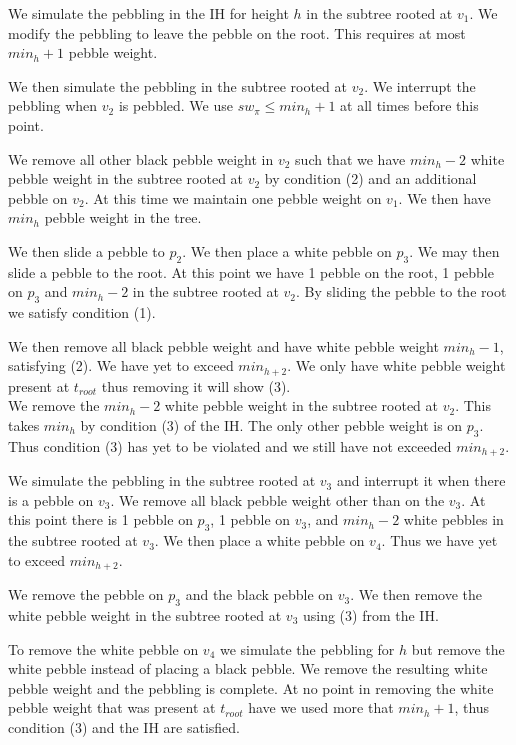 \documentclass[12pt]{article}
\newcommand{\troot}{t_{root}}
\begin{document}
We simulate the pebbling in the IH for height $h$ in the subtree rooted at $v_1$. We modify the pebbling to leave the pebble on the root. This requires at most $min_h+1$ pebble weight.

We then simulate the pebbling in the subtree rooted at $v_2$. We interrupt the pebbling when $v_2$ is pebbled. We use $sw_\pi \leq min_h + 1$ at all times before this point.

We remove all other black pebble weight in $v_2$ such that we have $min_h - 2$ white pebble weight in the subtree rooted at $v_2$ by condition (2) and an additional pebble on $v_2$. At this time we maintain one pebble weight on $v_1$. We then have $min_h$ pebble weight in the tree.

We then slide a pebble to $p_2$. We then place a white pebble on $p_3$. We may then slide a pebble to the root. At this point we have 1 pebble on the root, 1 pebble on $p_3$ and $min_h - 2$ in the subtree rooted at $v_2$. By sliding the pebble to the root we satisfy condition (1). 

We then remove all black pebble weight and have white pebble weight $min_h - 1$, satisfying (2). We have yet to exceed $min_{h+2}$. We only have white pebble weight present at $\troot$ thus removing it will show (3).\\

We remove the $min_h - 2$ white pebble weight in the subtree rooted at $v_2$. This takes $min_h$ by condition (3) of the IH. The only other pebble weight is on $p_3$. Thus condition (3) has yet to be violated and we still have not exceeded $min_{h+2}$.

We simulate the pebbling in the subtree rooted at $v_3$ and interrupt it when there is a pebble on $v_3$. We remove all black pebble weight other than on the $v_3$. At this point there is 1 pebble on $p_3$, 1 pebble on $v_3$, and $min_h - 2$ white pebbles in the subtree rooted at $v_3$. We then place a white pebble on $v_4$. Thus we have yet to exceed $min_{h+2}$.

We remove the pebble on $p_3$ and the black pebble on $v_3$. We then remove the white pebble weight in the subtree rooted at $v_3$ using (3) from the IH.

To remove the white pebble on $v_4$ we simulate the pebbling for $h$ but remove the white pebble instead of placing a black pebble. We remove the resulting white pebble weight and the pebbling is complete. At no point in removing the white pebble weight that was present at $\troot$ have we used more that $min_h+1$, thus condition (3) and the IH are satisfied.\\\\
\end{document}

